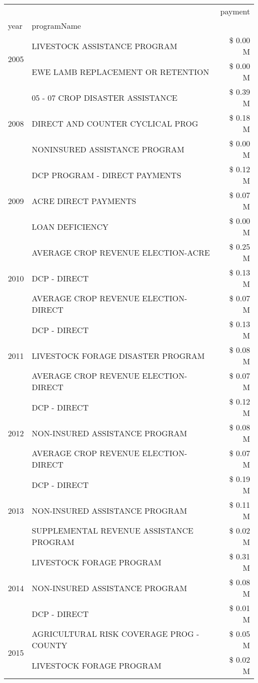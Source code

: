 \begin{tabular}{llr}
\toprule
 &  & payment \\
year & programName &  \\
\midrule
\multirow[t]{2}{*}{2005} & LIVESTOCK ASSISTANCE PROGRAM & \$ 0.00 M \\
 & EWE LAMB REPLACEMENT OR RETENTION & \$ 0.00 M \\
\cline{1-3}
\multirow[t]{3}{*}{2008} & 05 - 07 CROP DISASTER ASSISTANCE & \$ 0.39 M \\
 & DIRECT AND COUNTER CYCLICAL PROG & \$ 0.18 M \\
 & NONINSURED ASSISTANCE PROGRAM & \$ 0.00 M \\
\cline{1-3}
\multirow[t]{3}{*}{2009} & DCP PROGRAM - DIRECT PAYMENTS & \$ 0.12 M \\
 & ACRE DIRECT PAYMENTS & \$ 0.07 M \\
 & LOAN DEFICIENCY & \$ 0.00 M \\
\cline{1-3}
\multirow[t]{3}{*}{2010} & AVERAGE CROP REVENUE ELECTION-ACRE & \$ 0.25 M \\
 & DCP - DIRECT & \$ 0.13 M \\
 & AVERAGE CROP REVENUE ELECTION-DIRECT & \$ 0.07 M \\
\cline{1-3}
\multirow[t]{3}{*}{2011} & DCP - DIRECT & \$ 0.13 M \\
 & LIVESTOCK FORAGE DISASTER PROGRAM & \$ 0.08 M \\
 & AVERAGE CROP REVENUE ELECTION-DIRECT & \$ 0.07 M \\
\cline{1-3}
\multirow[t]{3}{*}{2012} & DCP - DIRECT & \$ 0.12 M \\
 & NON-INSURED ASSISTANCE PROGRAM & \$ 0.08 M \\
 & AVERAGE CROP REVENUE ELECTION-DIRECT & \$ 0.07 M \\
\cline{1-3}
\multirow[t]{3}{*}{2013} & DCP - DIRECT & \$ 0.19 M \\
 & NON-INSURED ASSISTANCE PROGRAM & \$ 0.11 M \\
 & SUPPLEMENTAL REVENUE ASSISTANCE PROGRAM & \$ 0.02 M \\
\cline{1-3}
\multirow[t]{3}{*}{2014} & LIVESTOCK FORAGE PROGRAM & \$ 0.31 M \\
 & NON-INSURED ASSISTANCE PROGRAM & \$ 0.08 M \\
 & DCP - DIRECT & \$ 0.01 M \\
\cline{1-3}
\multirow[t]{3}{*}{2015} & AGRICULTURAL RISK COVERAGE PROG - COUNTY & \$ 0.05 M \\
 & LIVESTOCK FORAGE PROGRAM & \$ 0.02 M \\

\end{tabular}
